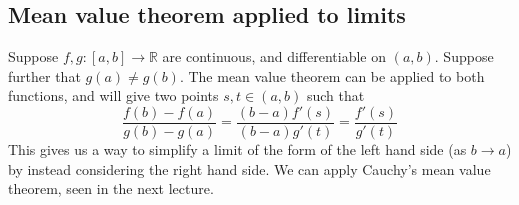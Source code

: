 \subsection{Mean value theorem applied to limits}
Suppose \(f, g \colon [a,b] \to \mathbb R\) are continuous, and differentiable on \((a, b)\).
Suppose further that \(g(a) \neq g(b)\).
The mean value theorem can be applied to both functions, and will give two points \(s, t \in (a, b)\) such that
\[
	\frac{f(b) - f(a)}{g(b) - g(a)} = \frac{(b-a)f'(s)}{(b-a)g'(t)} = \frac{f'(s)}{g'(t)}
\]
This gives us a way to simplify a limit of the form of the left hand side (as \(b \to a\)) by instead considering the right hand side.
We can apply Cauchy's mean value theorem, seen in the next lecture.
